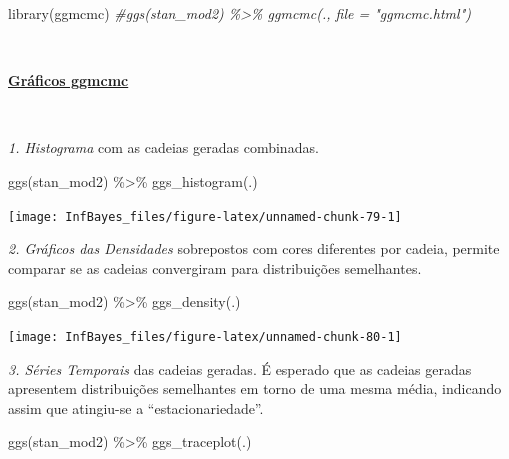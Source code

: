 \documentclass[
]{book}
\newenvironment{Shaded}{\begin{snugshade}}{\end{snugshade}}
\newcommand{\CommentTok}[1]{\textcolor[rgb]{0.56,0.35,0.01}{\textit{#1}}}
\newcommand{\FunctionTok}[1]{\textcolor[rgb]{0.00,0.00,0.00}{#1}}
\newcommand{\NormalTok}[1]{#1}
\newcommand{\SpecialCharTok}[1]{\textcolor[rgb]{0.00,0.00,0.00}{#1}}
\begin{document}
\begin{Shaded}
\begin{Highlighting}[]
\FunctionTok{library}\NormalTok{(ggmcmc)}
\CommentTok{\#ggs(stan\_mod2) \%\textgreater{}\% ggmcmc(., file = "ggmcmc.html")}
\end{Highlighting}
\end{Shaded}

\(~\)

\href{ggmcmc.html}{\textbf{Gráficos ggmcmc}}

\(~\)

\emph{1. Histograma} com as cadeias geradas combinadas.

\begin{Shaded}
\begin{Highlighting}[]
\FunctionTok{ggs}\NormalTok{(stan\_mod2) }\SpecialCharTok{\%\textgreater{}\%} \FunctionTok{ggs\_histogram}\NormalTok{(.)}
\end{Highlighting}
\end{Shaded}

\begin{center}\texttt{[image: InfBayes\_files/figure-latex/unnamed-chunk-79-1]} \end{center}

\emph{2. Gráficos das Densidades} sobrepostos com cores diferentes por cadeia, permite comparar se as cadeias convergiram para distribuições semelhantes.

\begin{Shaded}
\begin{Highlighting}[]
\FunctionTok{ggs}\NormalTok{(stan\_mod2) }\SpecialCharTok{\%\textgreater{}\%} \FunctionTok{ggs\_density}\NormalTok{(.)}
\end{Highlighting}
\end{Shaded}

\begin{center}\texttt{[image: InfBayes\_files/figure-latex/unnamed-chunk-80-1]} \end{center}

\emph{3. Séries Temporais} das cadeias geradas. É esperado que as cadeias geradas apresentem distribuições semelhantes em torno de uma mesma média, indicando assim que atingiu-se a ``estacionariedade''.

\begin{Shaded}
\begin{Highlighting}[]
\FunctionTok{ggs}\NormalTok{(stan\_mod2) }\SpecialCharTok{\%\textgreater{}\%} \FunctionTok{ggs\_traceplot}\NormalTok{(.)}
\end{Highlighting}
\end{Shaded}
\end{document}
